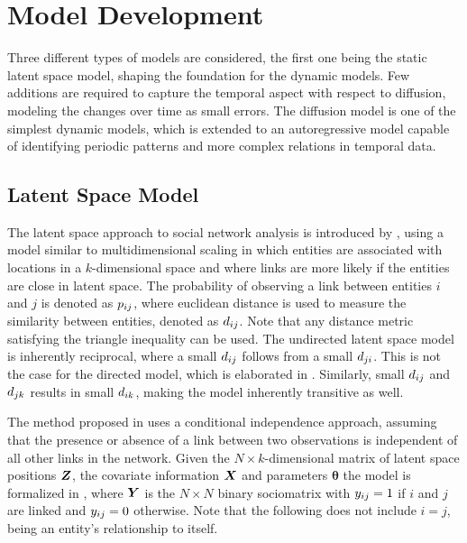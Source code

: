 \section{Model Development}

Three different types of models are considered, the first one being the static latent space model, shaping the foundation for the dynamic models.
Few additions are required to capture the temporal aspect with respect to diffusion, modeling the changes over time as small errors. The diffusion model is one of the simplest dynamic models, which is extended to an autoregressive model capable of identifying periodic patterns and more complex relations in temporal data.

\subsection{Latent Space Model}

    The latent space approach to social network analysis is introduced by \citeauthor{hoff2002latent} \cite{hoff2002latent}, using a model similar to multidimensional scaling in which entities are associated with locations in a $k$-dimensional space and where links are more likely if the entities are close in latent space. 
    The probability of observing a link between entities $i$ and $j$ is denoted as $\sub(p)$, where euclidean distance is used to measure the similarity between entities, denoted as $\sub(d)$. Note that any distance metric satisfying the triangle inequality can be used.
    The undirected latent space model is inherently reciprocal, where a small $\sub(d)$ follows from a small $\sub(d)(ji)$. This is not the case for the directed model, which is elaborated in .
    Similarly, small $\sub(d)$ and $\sub(d)(jk)$ results in small $\sub(d)(ik)$, making the model inherently transitive as well.
    
    The method proposed in \cite{hoff2002latent} uses a conditional independence approach, assuming that the presence or absence of a link between two observations is independent of all other links in the network. Given the $N\times k$-dimensional matrix of latent space positions $\bm{Z}$, the covariate information $\bm{X}$ and parameters $\bm{\theta}$ the model is formalized in , where $\bm{Y}$ is the $N\times N$ binary sociomatrix with $\sub(y)=1$ if $i$ and $j$ are linked and $\sub(y)=0$ otherwise. Note that the following does not include $i=j$, being an entity's relationship to itself.
    
